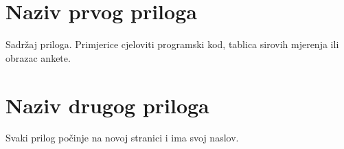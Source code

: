 \documentclass[12pt,a4paper,oneside]{report}
\begin{document}

\appendix
\renewcommand{\thechapter}{\Alph{chapter}}

\chapter{Naziv prvog priloga}

Sadržaj priloga. Primjerice cjeloviti programski kod, tablica sirovih mjerenja ili obrazac ankete.

\chapter{Naziv drugog priloga}

Svaki prilog počinje na novoj stranici i ima svoj naslov.
\end{document}
